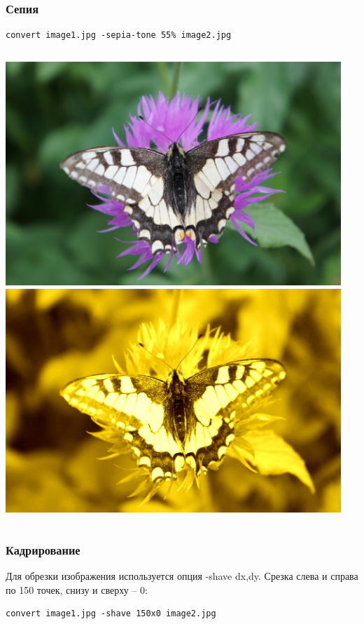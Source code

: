 \documentclass[11pt, compress]{beamer}
\renewcommand{\emph}[1]{\textcolor{dark-blue}{#1}}
\begin{document}
\begin{frame}[c, fragile]
\frametitle{Сепия}
\begin{lstlisting}
convert image1.jpg -sepia-tone 55% image2.jpg
\end{lstlisting}
\begin{columns}
\center
\includegraphics[width=0.95\textwidth]{FLY1000.jpg}
\center 
\includegraphics[width=0.95\textwidth]{FLY_sepia.jpg}
\end{columns}
\end{frame}

\begin{frame}[c, fragile]
\frametitle{Кадрирование}
Для обрезки изображения используется опция \emph{-shave dx,dy}. Срезка слева и справа по 150 точек, снизу и сверху -- 0:
\begin{lstlisting}
convert image1.jpg -shave 150x0 image2.jpg 
\end{lstlisting}
\end{frame}
\end{document}
